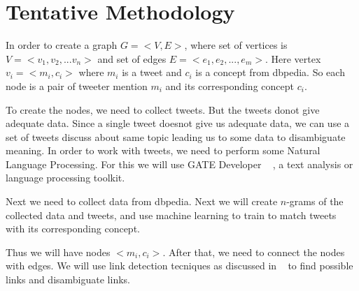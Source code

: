 \chapter{Tentative Methodology}\label{ch3}
In order to create a graph $G = <V,E>$, where set of vertices is $V = <v_1,v_2,... v_n>$ and
set of edges $E = <e_1, e_2,...,e_m>$. Here vertex $v_i = <m_i, c_i>$ where $m_i$ is a tweet and $c_i$
is a concept from dbpedia.
So each node is a pair of tweeter mention $m_i$ and its corresponding concept $c_i$.

To create the nodes, we need to collect tweets. But the tweets donot give adequate data. 
Since a single tweet doesnot give us adequate data, we can use a set of tweets discuss about same topic 
leading us to some data to disambiguate meaning. In order to work with tweets, we need to 
perform some Natural Language Processing. For this we will use GATE Developer ~\cite{url0gate} , a 
text analysis or language processing toolkit.

Next we need to collect data from dbpedia. Next we will create $n$-grams of the collected data and tweets,
 and use machine learning to train to match tweets with its corresponding concept.

 Thus we will have nodes $<m_i, c_i>$. After that, we need to connect the nodes with edges. 
 We will use link detection tecniques as discussed in ~\cite{ref3LinkWikipedia} to 
 find possible links and disambiguate links.


\endinput